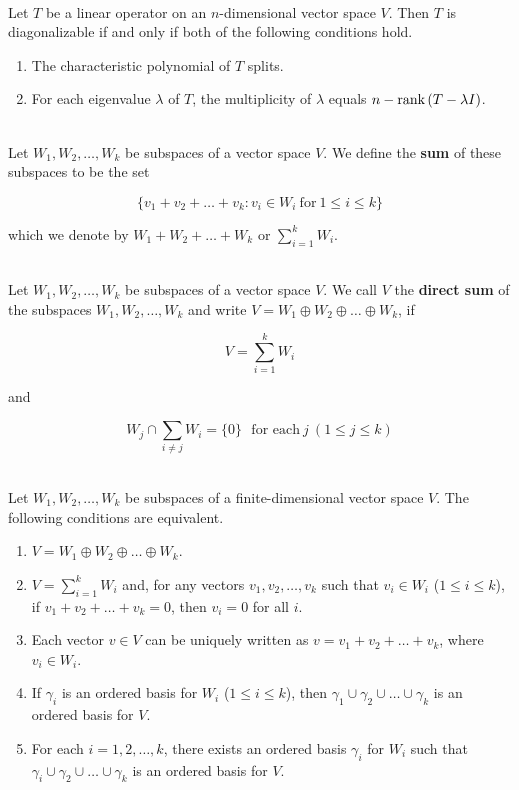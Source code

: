 \begin{remark}
	\hfill\\
	Let $T$ be a linear operator on an $n$-dimensional vector space $V$. Then $T$ is diagonalizable if and only if both of the following conditions hold.

	\begin{enumerate}
		\item The characteristic polynomial of $T$ splits.
		\item For each eigenvalue $\lambda$ of $T$, the multiplicity of $\lambda$ equals $n - \text{rank}\left(T - \lambda I\right)$.
	\end{enumerate}
\end{remark}

\begin{definition}
	\hfill\\
	Let $W_1, W_2, \dots, W_k$ be subspaces of a vector space $V$. We define the \textbf{sum} of these subspaces to be the set

	\[\{v_1 + v_2 + \dots + v_k : v_i \in W_i\ \text{for}\ 1 \leq i \leq k\}\]

	which we denote by $W_1 + W_2 + \dots + W_k$ or $\displaystyle\sum_{i=1}^{k}W_i$.
\end{definition}

\begin{definition}
	\hfill\\
	Let $W_1, W_2, \dots, W_k$ be subspaces of a vector space $V$. We call $V$ the \textbf{direct sum} of the subspaces $W_1, W_2, \dots, W_k$ and write $V = W_1 \oplus W_2 \oplus \dots \oplus W_k$, if

	\[V = \sum_{i=1}^{k}W_i\]

	and

	\[W_j \cap \sum_{i \neq j} W_i = \{0\}\ \ \ \text{for each}\ j\ (1 \leq j \leq k)\]
\end{definition}

\begin{theorem}
	\hfill\\
	Let $W_1, W_2, \dots, W_k$ be subspaces of a finite-dimensional vector space $V$. The following conditions are equivalent.

	\begin{enumerate}
		\item $V = W_1 \oplus W_2 \oplus \dots \oplus W_k$.
		\item $V = \displaystyle\sum_{i=1}^{k}W_i$ and, for any vectors $v_1, v_2, \dots, v_k$ such that $v_i \in W_i$ ($1 \leq i \leq k$), if $v_1 + v_2 + \dots + v_k = 0$, then $v_i = 0$ for all $i$.
		\item Each vector $v \in V$ can be uniquely written as $v = v_1 + v_2 + \dots + v_k$, where $v_i \in W_i$.
		\item If $\gamma_i$ is an ordered basis for $W_i$ ($1 \leq i \leq k$), then $\gamma_1 \cup \gamma_2 \cup \dots \cup \gamma_k$ is an ordered basis for $V$.
		\item For each $i = 1, 2, \dots, k$, there exists an ordered basis $\gamma_i$ for $W_i$ such that $\gamma_i \cup \gamma_2 \cup \dots \cup \gamma_k$ is an ordered basis for $V$.
	\end{enumerate}
\end{theorem}

